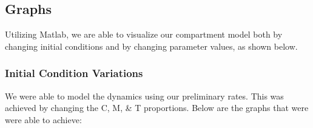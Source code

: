 \documentclass[12pt]{article}
\begin{document}
\subsection{Graphs}
Utilizing Matlab, we are able to visualize our compartment model both by changing initial conditions and by changing parameter values, as shown below.
\subsubsection{Initial Condition Variations}
We were able to model the dynamics using our preliminary rates. This was achieved by changing the C, M, \& T proportions. Below are the graphs that were were able to achieve:\\
\begin{figure}[H]%
        \centering
        \quad
        \\

\end{figure}
\end{document}
